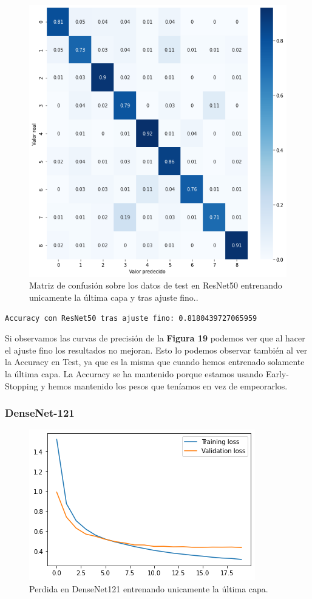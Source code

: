 \begin{figure}[H]
  \centering
  \includegraphics[width=0.5\linewidth]{Imagenes/entrenamiento_redes/ult/resnet_fine_matriz.png}
  \caption{Matriz de confusión sobre los datos de test en ResNet50 entrenando unicamente la última capa y tras ajuste fino..}
\end{figure}

\begin{lstlisting}
Accuracy con ResNet50 tras ajuste fino: 0.8180439727065959
\end{lstlisting}

Si observamos las curvas de precisión de la \textbf{Figura 19} podemos ver que al hacer el ajuste fino los resultados no mejoran. Esto lo podemos observar también al ver la Accuracy en Test, ya que es la misma que cuando hemos entrenado solamente la última capa. La Accuracy se ha mantenido porque estamos usando Early-Stopping y hemos mantenido los pesos que teníamos en vez de empeorarlos.

\subsubsection{DenseNet-121}


\begin{figure}[H]
  \centering
  \includegraphics[width=0.5\linewidth]{Imagenes/entrenamiento_redes/ult/densenet_ult_loss.png}
  \caption{Perdida en DenseNet121 entrenando unicamente la última capa.}
\end{figure}

